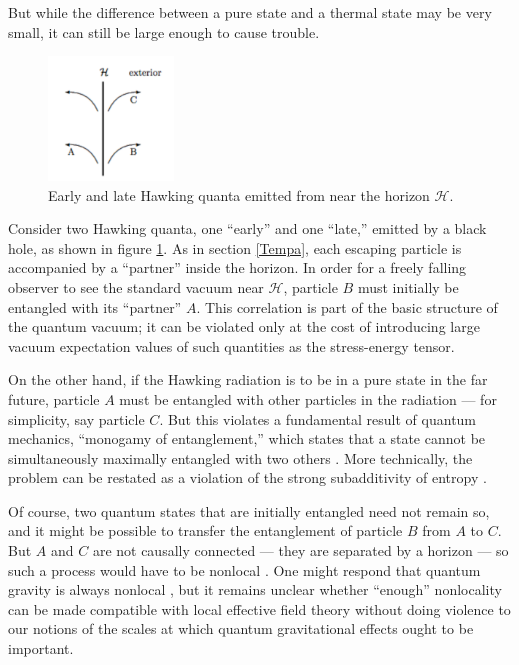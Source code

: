 \documentclass[11pt]{article}
\begin{document}
But while the difference between a pure state and a thermal state
may be very small, it can still be large enough to cause trouble.
\begin{figure}
\centerline{\includegraphics[height=1.3in]{unitary.pdf}}
\caption{Early and late Hawking quanta emitted from near the
horizon $\mathcal{H}$.}
\label{Carlipfig6}
\end{figure}
Consider two Hawking quanta, one ``early'' and one ``late,'' 
emitted by a black hole, as shown in figure \ref{Carlipfig6}.
As in section \ref{Tempa}, each escaping particle 
is accompanied by a ``partner'' inside the horizon.  In order 
for a freely falling observer to see the standard vacuum near
 $\mathcal{H}$, particle $B$ must initially be 
entangled with its ``partner'' $A$.  This correlation is part of 
the basic structure of the quantum vacuum; it can be violated 
only at the cost of introducing large vacuum expectation values 
of such quantities as the stress-energy tensor.

On the other hand, if the Hawking radiation is to be in a pure 
state in the far future, particle $A$ must be entangled with
other particles in the radiation --- for simplicity, say particle
$C$.  But this violates a fundamental result of quantum mechanics,
``monogamy of entanglement,'' which states that a state
cannot be simultaneously maximally entangled with two
others \cite{monogamy}.  More technically, the problem can be
restated as a violation of the strong subadditivity of entropy
\cite{AMPS}.

Of course, two quantum states that are initially entangled need
not remain so, and it might be possible to transfer the entanglement
of particle $B$ from $A$ to $C$.  But $A$ and $C$ are not causally 
connected --- they are separated by a horizon --- so such a process 
would have to be nonlocal
\cite{Giddingsz}.   One might respond that quantum gravity is
always nonlocal \cite{Jacobsonx,Papadodimasb}, but it remains 
unclear whether ``enough'' nonlocality can be made compatible 
with local effective field theory without doing violence to 
our notions of the scales at which quantum gravitational effects
ought to be important.
\end{document}
